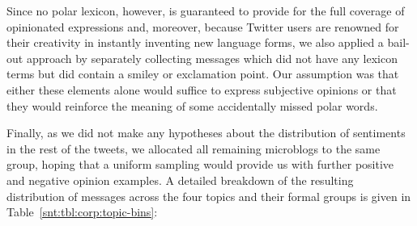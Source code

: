 Since no polar lexicon, however, is guaranteed to provide for the full
coverage of opinionated expressions and, moreover, because Twitter
users are renowned for their creativity in instantly inventing new
language forms, we also applied a bail-out approach by separately
collecting messages which did not have any lexicon terms but did
contain a smiley or exclamation point.  Our assumption was that either
these elements alone would suffice to express subjective opinions or
that they would reinforce the meaning of some accidentally missed
polar words.

Finally, as we did not make any hypotheses about the distribution of
sentiments in the rest of the tweets, we allocated all remaining
microblogs to the same group, hoping that a uniform sampling would
provide us with further positive and negative opinion examples.  A
detailed breakdown of the resulting distribution of messages across
the four topics and their formal groups is given in
Table~\ref{snt:tbl:corp:topic-bins}:
